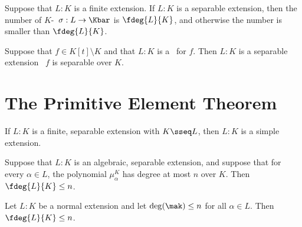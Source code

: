 \documentclass{article}
\begin{document}
\begin{tcorollary}
  Suppose that \( L:K \) is a finite extension.
  If \( L:K \) is a separable extension, then the number of \( K \)-\homo~\( \sigma:L\to\Kbar \) is \( \fdeg{L}{K} \), and otherwise the number is smaller than \( \fdeg{L}{K} \).
\end{tcorollary}

\begin{tcorollary}
  Suppose that \( f\in K[t]\setminus K \) and that \( L:K \) is a \sfe~for \( f \).
  Then \( L:K \) is a separable extension \iff~\( f \) is separable over \( K \).
\end{tcorollary}

\section{The Primitive Element Theorem}

\begin{ttheorem}
  If \( L:K \) is a finite, separable extension with \( K\sseq L \), then \( L:K \) is a simple extension.
\end{ttheorem}

\begin{tcorollary}
  Suppose that \( L:K \) is an algebraic, separable extension, and suppose that for every \( \alpha\in L \), the polynomial \( \mu_\alpha^K \) has degree at most \( n \) over \( K \).
  Then \( \fdeg{L}{K}\leq n \).
\end{tcorollary}

\quad Let \( L:K \) be a normal extension and let \( \deg(\mak)\leq n \) for all \( \alpha\in L \).
Then \( \fdeg{L}{K}\leq n \).

\end{document}
